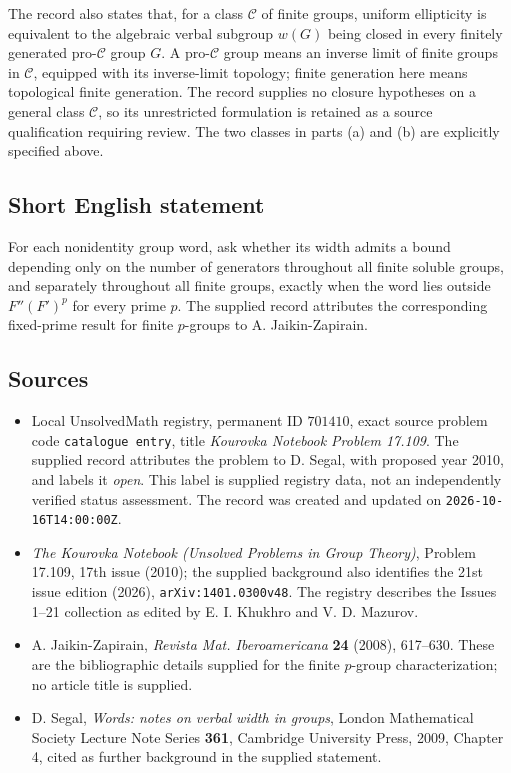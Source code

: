 \documentclass[11pt]{article}
\begin{document}
The record also states that, for a class \(\mathcal C\) of finite groups, uniform ellipticity is equivalent to the algebraic verbal subgroup \(w(G)\) being closed in every finitely generated pro-\(\mathcal C\) group \(G\). A pro-\(\mathcal C\) group means an inverse limit of finite groups in \(\mathcal C\), equipped with its inverse-limit topology; finite generation here means topological finite generation. The record supplies no closure hypotheses on a general class \(\mathcal C\), so its unrestricted formulation is retained as a source qualification requiring review. The two classes in parts (a) and (b) are explicitly specified above.
\subsection{Short English statement}
For each nonidentity group word, ask whether its width admits a bound depending only on the number of generators throughout all finite soluble groups, and separately throughout all finite groups, exactly when the word lies outside \(F''(F')^p\) for every prime \(p\). The supplied record attributes the corresponding fixed-prime result for finite \(p\)-groups to A. Jaikin-Zapirain.
\subsection{Sources}
\begin{itemize}
\item Local UnsolvedMath registry, permanent ID \(701410\), exact source problem code \texttt{catalogue entry}, title \emph{Kourovka Notebook Problem 17.109}. The supplied record attributes the problem to D. Segal, with proposed year 2010, and labels it \emph{open}. This label is supplied registry data, not an independently verified status assessment. The record was created and updated on \texttt{2026-10-16T14:00:00Z}.
\item \emph{The Kourovka Notebook (Unsolved Problems in Group Theory)}, Problem 17.109, 17th issue (2010); the supplied background also identifies the 21st issue edition (2026), \texttt{arXiv:1401.0300v48}. The registry describes the Issues 1--21 collection as edited by E. I. Khukhro and V. D. Mazurov.
\item A. Jaikin-Zapirain, \emph{Revista Mat. Iberoamericana} \textbf{24} (2008), 617--630. These are the bibliographic details supplied for the finite \(p\)-group characterization; no article title is supplied.
\item D. Segal, \emph{Words: notes on verbal width in groups}, London Mathematical Society Lecture Note Series \textbf{361}, Cambridge University Press, 2009, Chapter 4, cited as further background in the supplied statement.
\end{itemize}
\end{document}
